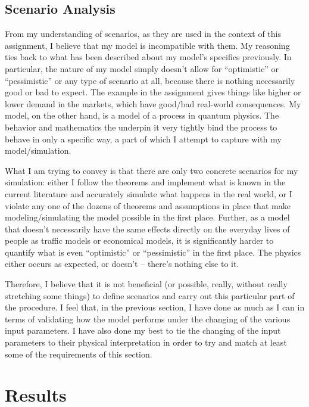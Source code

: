 \subsection{Scenario Analysis}

From my understanding of scenarios, as they are used in the context of this assignment, I believe that my model is incompatible with them. My reasoning ties back to what has been described about my model's specifics previously. In particular, the nature of my model simply doesn't allow for ``optimistic'' or ``pessimistic'' or any type of scenario at all, because there is nothing necessarily good or bad to expect. The example in the assignment gives things like higher or lower demand in the markets, which have good/bad real-world consequences. My model, on the other hand, is a model of a process in quantum physics. The behavior and mathematics the underpin it very tightly bind the process to behave in only a specific way, a part of which I attempt to capture with my model/simulation.

What I am trying to convey is that there are only two concrete scenarios for my simulation: either I follow the theorems and implement what is known in the current literature and accurately simulate what happens in the real world, or I violate any one of the dozens of theorems and assumptions in place that make modeling/simulating the model possible in the first place. Further, as a model that doesn't necessarily have the same effects directly on the everyday lives of people as traffic models or economical models, it is significantly harder to quantify what is even ``optimistic'' or ``pessimistic'' in the first place. The physics either occurs as expected, or doesn't -- there's nothing else to it.

Therefore, I believe that it is not beneficial (or possible, really, without really stretching some things) to define scenarios and carry out this particular part of the procedure. I feel that, in the previous section, I have done as much as I can in terms of validating how the model performs under the changing of the various input parameters. I have also done my best to tie the changing of the input parameters to their physical interpretation in order to try and match at least some of the requirements of this section.



\section{Results}


